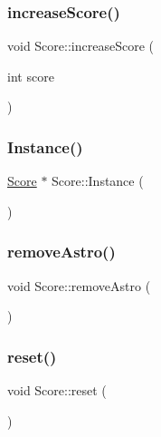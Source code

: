 \subsubsection{\texorpdfstring{increase\+Score()}{increaseScore()}}
{\footnotesize\ttfamily void Score\+::increase\+Score (\begin{DoxyParamCaption}\item[{int}]{score }\end{DoxyParamCaption})}

\mbox{\label{class_score_a7d5516454642a247be184d5063404d04}} 
\subsubsection{\texorpdfstring{Instance()}{Instance()}}
{\footnotesize\ttfamily \hyperlink{class_score}{Score} $\ast$ Score\+::\+Instance (\begin{DoxyParamCaption}{ }\end{DoxyParamCaption})\hspace{0.3cm}{\ttfamily [static]}}

\mbox{\label{class_score_ac826af8103f602c71d75d36aeecdff35}} 
\subsubsection{\texorpdfstring{remove\+Astro()}{removeAstro()}}
{\footnotesize\ttfamily void Score\+::remove\+Astro (\begin{DoxyParamCaption}{ }\end{DoxyParamCaption})}

\mbox{\label{class_score_a32804ba9a847e58160e6e0cef46e1f25}} 
\subsubsection{\texorpdfstring{reset()}{reset()}}
{\footnotesize\ttfamily void Score\+::reset (\begin{DoxyParamCaption}{ }\end{DoxyParamCaption})}

\mbox{\label{class_score_a152a46eb1f165db706409369d4da7959}} 
